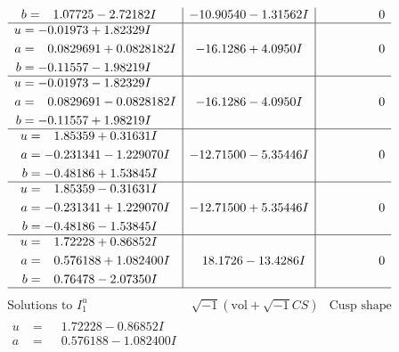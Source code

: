 \documentclass[1p]{elsarticle_modified}
\theoremstyle{definition}
\newcommand{\I}{\sqrt{-1}}
\begin{document}
$$\begin{array}{c|c|c}
\begin{aligned}
b &= \phantom{-}1.07725 - 2.72182 I\end{aligned}
 & -10.90540 - 1.31562 I & \phantom{-0.000000 } 0 \\ \hline\begin{aligned}
u &= -0.01973 + 1.82329 I \\
a &= \phantom{-}0.0829691 + 0.0828182 I \\
b &= -0.11557 - 1.98219 I\end{aligned}
 & -16.1286 + 4.0950 I & \phantom{-0.000000 } 0 \\ \hline\begin{aligned}
u &= -0.01973 - 1.82329 I \\
a &= \phantom{-}0.0829691 - 0.0828182 I \\
b &= -0.11557 + 1.98219 I\end{aligned}
 & -16.1286 - 4.0950 I & \phantom{-0.000000 } 0 \\ \hline\begin{aligned}
u &= \phantom{-}1.85359 + 0.31631 I \\
a &= -0.231341 - 1.229070 I \\
b &= -0.48186 + 1.53845 I\end{aligned}
 & -12.71500 - 5.35446 I & \phantom{-0.000000 } 0 \\ \hline\begin{aligned}
u &= \phantom{-}1.85359 - 0.31631 I \\
a &= -0.231341 + 1.229070 I \\
b &= -0.48186 - 1.53845 I\end{aligned}
 & -12.71500 + 5.35446 I & \phantom{-0.000000 } 0 \\ \hline\begin{aligned}
u &= \phantom{-}1.72228 + 0.86852 I \\
a &= \phantom{-}0.576188 + 1.082400 I \\
b &= \phantom{-}0.76478 - 2.07350 I\end{aligned}
 & \phantom{-}18.1726 - 13.4286 I & \phantom{-0.000000 } 0\\
 \hline 
 \end{array}$$\newpage$$\begin{array}{c|c|c}  
\text{Solutions to }I^u_{1}& \I (\text{vol} + \sqrt{-1}CS) & \text{Cusp shape}\\
 \hline 
\begin{aligned}
u &= \phantom{-}1.72228 - 0.86852 I \\
a &= \phantom{-}0.576188 - 1.082400 I \\

\end{aligned}
\end{array}$$
\end{document}
